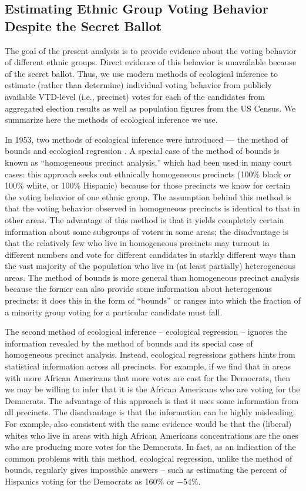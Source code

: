 \documentclass[12pt,draft]{scrartcl}
\begin{document}
\subsection{Estimating Ethnic Group Voting Behavior Despite the Secret Ballot}
\label{s:ei}

The goal of the present analysis is to provide evidence about the
voting behavior of different ethnic groups. Direct evidence of this
behavior is unavailable because of the secret ballot. Thus, we use
modern methods of ecological inference to estimate (rather than
determine) individual voting behavior from publicly available
VTD-level (i.e., precinct) votes for each of the candidates from
aggregated election results as well as population figures from the US
Census.  We summarize here the methods of ecological inference we use.

In 1953, two methods of ecological inference were introduced --- the
method of bounds \citep{duncan1953} and ecological regression
\citep{goodman1953}. A special case of the method of bounds is known
as ``homogeneous precinct analysis,'' which had been used in many
court cases: this approach seeks out ethnically homogeneous precincts
(100\% black or 100\% white, or 100\% Hispanic) because for those
precincts we know for certain the voting behavior of one ethnic group.
The assumption behind this method is that the voting behavior observed
in homogeneous precincts is identical to that in other areas. The
advantage of this method is that it yields completely certain
information about some subgroups of voters in some areas; the
disadvantage is that the relatively few who live in homogeneous
precincts may turnout in different numbers and vote for different
candidates in starkly different ways than the vast majority of the
population who live in (at least partially) heterogeneous areas.  The
method of bounds is more general than homogeneous precinct analysis
because the former can also provide some information about
heterogenous precincts; it does this in the form of ``bounds'' or
ranges into which the fraction of a minority group voting for a
particular candidate must fall.

The second method of ecological inference -- ecological regression --
ignores the information revealed by the method of bounds and its
special case of homogeneous precinct analysis. Instead, ecological
regressions gathers hints from statistical information across all
precincts. For example, if we find that in areas with more African
Americans that more votes are cast for the Democrats, then we may be
willing to infer that it is the African Americans who are voting for
the Democrats. The advantage of this approach is that it uses some
information from all precincts. The disadvantage is that the
information can be highly misleading: For example, also consistent
with the same evidence would be that the (liberal) whites who live in
areas with high African Americans concentrations are the ones who are
producing more votes for the Democrats. In fact, as an indication of
the common problems with this method, ecological regression, unlike
the method of bounds, regularly gives impossible answers -- such as
estimating the percent of Hispanics voting for the Democrats as 160\%
or $-54$\%.
\end{document}
